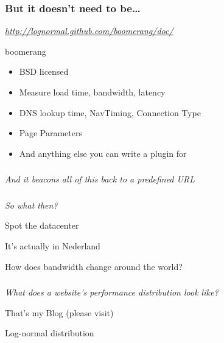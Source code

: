 \documentclass{beamer}
\newcommand{\innersplash}[1]{
  \begin{center}
    \Large \textrm{\textit{ #1 } }
  \end{center}
}
\newcommand{\splashslide}[2][{}]{
  \begin{frame}
  \frametitle{#1}
  \innersplash{#2}
  \end{frame}
}
\begin{document}
\splashslide[But it doesn't need to be\ldots]{\href{http://www.realusermeasurement.org/}{http://lognormal.github.com/boomerang/doc/}}

\begin{frame}{boomerang}
  \begin{itemize}
    \item BSD licensed
    \item Measure load time, bandwidth, latency
    \item DNS lookup time, NavTiming, Connection Type
    \item Page Parameters
    \item And anything else you can write a plugin for
  \end{itemize}
\end{frame}

\splashslide{And it beacons all of this back to a predefined URL}

\splashslide{So what then?}

\begin{frame}{Spot the datacenter}
\end{frame}

\begin{frame}{It's actually in Nederland}
\end{frame}

\begin{frame}{How does bandwidth change around the world?}
\end{frame}


\splashslide{What does a website's performance distribution look like?}

\begin{frame}{That's my Blog (please visit)}
\end{frame}

\begin{frame}{Log-normal distribution}
\end{frame}
\end{document}
